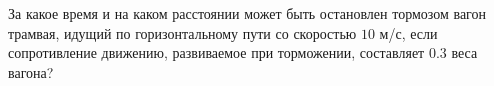 За какое время и на каком расстоянии может быть остановлен тормозом
вагон трамвая, идущий по горизонтальному пути со скоростью $10$ м/с,
если сопротивление движению, развиваемое при торможении, составляет
$0.3$ веса вагона?

